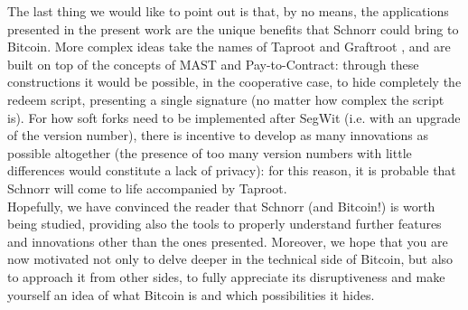 \bigskip
\noindent
The last thing we would like to point out is that, by no means, the applications presented in the present work are the unique benefits that Schnorr could bring to Bitcoin. More complex ideas take the names of Taproot \cite{Taproot} and Graftroot \cite{Graftroot}, and are built on top of the concepts of MAST and Pay-to-Contract: through these constructions it would be possible, in the cooperative case, to hide completely the redeem script, presenting a single signature (no matter how complex the script is). For how soft forks need to be implemented after SegWit (i.e. with an upgrade of the version number), there is incentive to develop as many innovations as possible altogether (the presence of too many version numbers with little differences would constitute a lack of privacy): for this reason, it is probable that Schnorr will come to life accompanied by Taproot. 
\\
Hopefully, we have convinced the reader that Schnorr (and Bitcoin!) is worth being studied, providing also the tools to properly understand further features and innovations other than the ones presented. Moreover, we hope that you are now motivated not only to delve deeper in the technical side of Bitcoin, but also to approach it from other sides, to fully appreciate its disruptiveness and make yourself an idea of what Bitcoin is and which possibilities it hides.